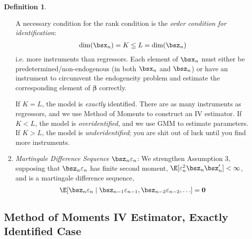 \documentclass[12pt]{article}
\theoremstyle{plain}
\theoremstyle{definition}
\newtheorem{defn}[thm]{Definition}
\theoremstyle{remark}
\newcommand{\bsbeta}{\boldsymbol{\beta}}
\renewcommand{\bso}{\boldsymbol{0}}
\begin{document}
\begin{defn}
\begin{enumerate}
    A necessary condition for the rank condition is the
    \emph{order condition for identification}:
    \begin{align*}
      \dim(\bsx_n) = K \leq L = \dim(\bsz_n)
    \end{align*}
    i.e. more instruments than regressors. Each element of $\bsx_n$ must
    either be predetermined/non-endogenous (in both $\bsx_n$ and
    $\bsz_n$) or have an instrument to circumvent the endogeneity
    problem and estimate the corresponding element of $\bsbeta$
    correctly.

    If $K=L$, the model is \emph{exactly} identified. There are as many
    instruments as regressors, and we use Method of Moments to construct
    an IV estimator. If $K< L$, the model is \emph{overidentified},
    and we use GMM to estimate parameters. If $K>L$, the model is
    \emph{underidentified}; you are shit out of luck until you find more
    instruments.

  \item \emph{Martingale Difference Sequence $\bsz_n\varepsilon_n$}:
    We strengthen Assumption 3, supposing that
    $\bsz_n\varepsilon_n$ has finite second moment,
    $\E[\varepsilon_n^2\bsz_n\bsz_n']<\infty$, and is a martingale
    difference sequence,
    \begin{align*}
      \E[\bsz_n\varepsilon_n\;|\;
      \bsz_{n-1}\varepsilon_{n-1},\bsz_{n-2}\varepsilon_{n-2},\ldots]
      = \bso
    \end{align*}
\end{enumerate}
\end{defn}

\subsection{Method of Moments IV Estimator, Exactly Identified Case}
\end{document}
